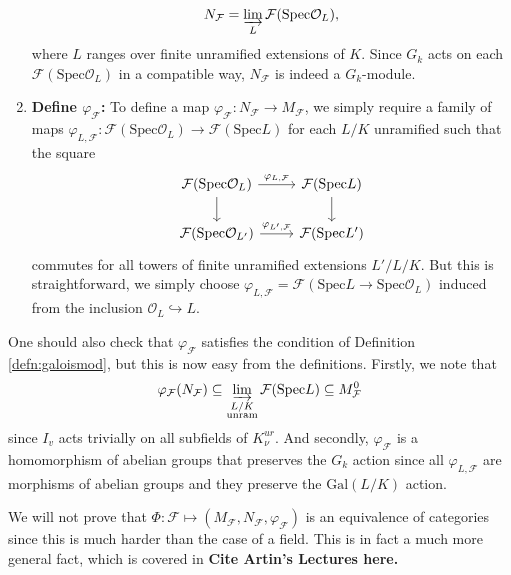 \documentclass{article}
\newcommand{\Spec}{\mathrm{Spec}}
\newcommand{\Gal}{\mathrm{Gal}}
\theoremstyle{plain}
\theoremstyle{definition}
\begin{document}
\begin{enumerate}[(1)]
        $$N_\mathcal{F}=\varinjlim_{L}\mathcal{F}(\Spec\mathcal{O}_L),$$
        where $L$ ranges over finite unramified extensions of $K$. Since $G_k$ acts on each $\mathcal{F}(\Spec\mathcal{O}_L)$ in a compatible way, $N_\mathcal{F}$ is indeed a $G_k$-module.
        \item \textbf{Define $\varphi_\mathcal{F}$:} To define a map $\varphi_\mathcal{F}:N_\mathcal{F}\to M_\mathcal{F}$, we simply require a family of maps $\varphi_{L,\mathcal{F}}:\mathcal{F}(\Spec\mathcal{O}_L)\to\mathcal{F}(\Spec L)$ for each $L/K$ unramified such that the square 
        \[
            \begin{tikzcd}
                \mathcal{F}(\Spec\mathcal{O}_L) \arrow[r,"\varphi_{L,\mathcal{F}}"] \arrow[d,""] & \mathcal{F}(\Spec L) \arrow[d,""] \\
                \mathcal{F}(\Spec\mathcal{O}_{L'}) \arrow[r,"\varphi_{L',\mathcal{F}}"] & \mathcal{F}(\Spec L')
            \end{tikzcd}
        \]
        commutes for all towers of finite unramified extensions $L'/L/K$. But this is straightforward, we simply choose $\varphi_{L,\mathcal{F}}=\mathcal{F}(\Spec L\to\Spec\mathcal{O}_L)$ induced from the inclusion $\mathcal{O}_L\hookrightarrow L$. 
    \end{enumerate}
    One should also check that $\varphi_\mathcal{F}$ satisfies the condition of Definition \ref{defn:galoismod}, but this is now easy from the definitions. Firstly, we note that 
    $$\varphi_\mathcal{F}(N_\mathcal{F})\subseteq\varinjlim_{\substack{L/K\\\text{unram}}}\mathcal{F}(\Spec L)\subseteq M_\mathcal{F}^{0}$$
    since $I_v$ acts trivially on all subfields of $K^{ur}_\nu$. And secondly, $\varphi_\mathcal{F}$ is a homomorphism of abelian groups that preserves the $G_k$ action since all $\varphi_{L,\mathcal{F}}$ are morphisms of abelian groups and they preserve the $\Gal(L/K)$ action. 

    We will not prove that $\Phi:\mathcal{F}\mapsto(M_\mathcal{F},N_\mathcal{F},\varphi_\mathcal{F})$ is an equivalence of categories since this is much harder than the case of a field. This is in fact a much more general fact, which is covered in \textbf{Cite Artin's Lectures here.}
\end{document}
